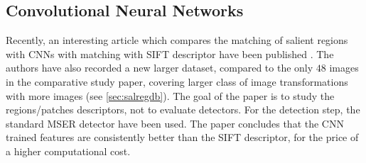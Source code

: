 \subsection{Convolutional Neural Networks}

Recently, an interesting article which compares the matching of salient regions  with CNNs with matching with SIFT descriptor have been published \cite{FischerDB14}. The authors have also recorded a new larger dataset, compared to the only $48$ images in the comparative study paper, covering larger class of image transformations with more images (see \ref{sec:salregdb}). The goal of the paper is to study the regions/patches descriptors, not to evaluate detectors. For the detection step, the standard MSER detector have been used. The paper concludes that the CNN trained features are consistently better than the SIFT descriptor, for the price of a higher computational cost.